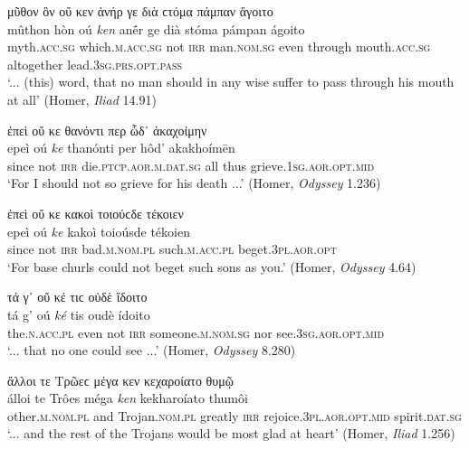 \begin{exe}
\ex μῦθον ὃν οὔ κεν ἀνήρ γε διὰ ϲτόμα πάμπαν ἄγοιτο\\
\gll mûthon hòn oú \emph{ken} anḗr ge dià stóma pámpan ágoito\\
myth.\textsc{acc.sg} which.\textsc{m.acc.sg} not \textsc{irr} man.\textsc{nom.sg} even through mouth.\textsc{acc.sg} altogether lead.\textsc{3sg.prs.opt.pass}\\
\trans `... (this) word, that no man should in any wise suffer to pass through his mouth at all' (Homer, \textit{Iliad} 14.91)
\label{ouke1}
\end{exe}

\begin{exe}
\ex ἐπεὶ οὔ κε θανόντι περ ὧδ᾽ ἀκαχοίμην\\
\gll epeì oú \emph{ke} thanónti per hôd' akakhoímēn\\
since not \textsc{irr} die.\textsc{ptcp.aor.m.dat.sg} all thus
grieve.\textsc{1sg.aor.opt.mid}\\
\trans `For I should not so grieve for his death ...' (Homer, \textit{Odyssey} 1.236)
\label{ouke2}
\end{exe}

\begin{exe}
\ex ἐπεὶ οὔ κε κακοὶ τοιούϲδε τέκοιεν\\
\gll epeì oú \emph{ke} kakoì toioúsde tékoien\\
since not \textsc{irr} bad.\textsc{m.nom.pl} such.\textsc{m.acc.pl} beget.\textsc{3pl.aor.opt}\\
\trans `For base churls could not beget such sons as you.' (Homer, \textit{Odyssey} 4.64)
\label{ouke3}
\end{exe}

\begin{exe}
\ex τά γ᾽ οὔ κέ τιϲ οὐδὲ ἴδοιτο\\
\gll tá g' oú \emph{ké} tis oudè ídoito\\
the.\textsc{n.acc.pl} even not \textsc{irr} someone.\textsc{m.nom.sg} nor see.\textsc{3sg.aor.opt.mid}\\
\trans `... that no one could see ...' (Homer, \textit{Odyssey} 8.280)
\label{ouke4}
\end{exe}

\begin{exe}
\ex ἄλλοι τε Τρῶεϲ μέγα κεν κεχαροίατο θυμῷ\\
\gll álloi te Trôes méga \emph{ken} kekharoíato thumôi\\ 
other.\textsc{m.nom.pl} and Trojan.\textsc{nom.pl} greatly \textsc{irr} rejoice.\textsc{3pl.aor.opt.mid} spirit.\textsc{dat.sg}\\
\trans `... and the rest of the Trojans would be most glad at heart' (Homer, \textit{Iliad} 1.256)
\label{Homer1256}
\end{exe}

